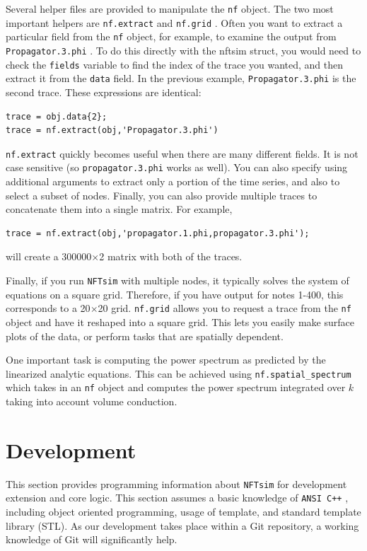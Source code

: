 \documentclass[12pt,a4paper]{article}
\newcommand{\type}[1]{{\small\small\tt #1} }
\newcommand{\NF}[0]{\type{NFTsim}}
\begin{document}
Several helper files are provided to manipulate the \type{nf} object. The two most important helpers are \type{nf.extract} and \type{nf.grid}. Often you want to extract a particular field from the \type{nf} object, for example, to examine the output from \type{Propagator.3.phi}. To do this directly with the nftsim struct, you would need to check the \type{fields} variable to find the index of the trace you wanted, and then extract it from the \type{data} field. In the previous example, \type{Propagator.3.phi} is the second trace. These expressions are identical:
\begin{lstlisting}
trace = obj.data{2};
trace = nf.extract(obj,'Propagator.3.phi')
\end{lstlisting}
\type{nf.extract} quickly becomes useful when there are many different fields. It is not case sensitive (so \type{propagator.3.phi} works as well). You can also specify using additional arguments to extract only a portion of the time series, and also to select a subset of nodes. Finally, you can also provide multiple traces to concatenate them into a single matrix. For example,
\begin{lstlisting}
trace = nf.extract(obj,'propagator.1.phi,propagator.3.phi');
\end{lstlisting}
will create a 300000$\times$2 matrix with both of the traces.

Finally, if you run \NF with multiple nodes, it typically solves the system of equations on a square grid. Therefore, if you have output for notes 1-400, this corresponds to a 20$\times$20 grid. \type{nf.grid} allows you to request a trace from the \type{nf} object and have it reshaped into a square grid. This lets you easily make surface plots of the data, or perform tasks that are spatially dependent.

One important task is computing the power spectrum as predicted by the linearized analytic equations. This can be achieved using \type{nf.spatial\_spectrum} which takes in an \type{nf} object and computes the power spectrum integrated over $k$ taking into account volume conduction.

\section{Development}

This section provides programming information about \NF for development extension and core logic. This section assumes a basic knowledge of \type{ANSI C++}, including object oriented programming, usage of template, and standard template library (STL). As our development takes place within a Git repository, a working knowledge of Git will significantly help.
\end{document}
